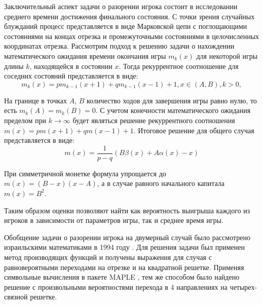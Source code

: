 Заключительный аспект задачи о разорении игрока состоит в исследовании среднего времени достижения финального состояния. С точки зрения случайных блужданий процесс представляется в виде Марковской цепи с поглощающими состояниями на концах отрезка и промежуточными состояниями в целочисленных координатах отрезка. Рассмотрим подход к решению задачи о нахождении математического ожидания времени окончания игры $m_k(x)$ для некоторой игры длины $k$, находящейся в состоянии $x$. Тогда рекуррентное соотношение для соседних состояний представляется в виде:
\begin{equation}
    \label{eq:eq5}
    m_k(x) = p m_{k-1}\left (x + 1 \right ) + q m_{k-1}\left (x - 1 \right ) + 1, x \in (A, B), k > 0,
\end{equation}

На границе в точках $A$, $B$ количество ходов для завершения игры равно нулю, то есть $m_k(A) = m_k(B) = 0$. С учетом конечности математического ожидания пределом при $k \xrightarrow{} \infty$ будет являться решение рекуррентного соотношения $m(x)=p m(x+1) +q m(x - 1) + 1$. Итоговое решение для общего случая представляется в виде:
\begin{equation}
    \label{eq:eq6}
    m(x) = \frac{1}{p - q} (B \beta(x) + A \alpha(x) - x)
\end{equation}

При симметричной монетке формула упрощается до $m(x) = (B - x) (x - A)$, а в случае равного начального капитала $m(x) = B^2$.

Таким образом оценки позволяют найти как вероятность выигрыша каждого из игроков в зависимости от параметров игры, так и среднее время игры.

Обобщение задачи о разорении игрока на двумерный случай было рассмотрено израильскими математиками в 1994 году \cite{orr_computer_1994}. Для решения задачи был применен метод производящих функций и получены выражения для случая с равновероятными переходами на отрезке и на квадратной решетке. Применяя символьные вычисления в пакете MAPLE \cite{monagan2012maple}, тем же способом было найдено решение с произвольными вероятностями перехода в 4 направлениях на четырех-связной решетке. 

